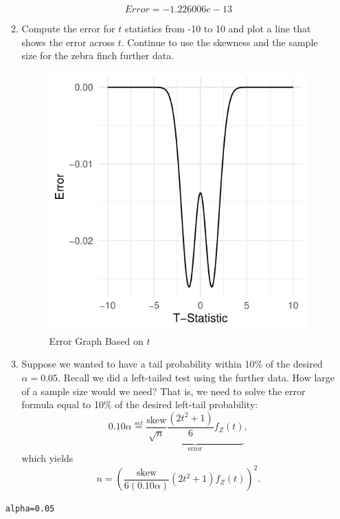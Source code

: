 \documentclass{article}\usepackage[]{graphicx}\usepackage[]{xcolor}
\makeatletter
\def\maxwidth{ %
  \ifdim\Gin@nat@width>\linewidth
    \linewidth
  \else
    \Gin@nat@width
  \fi
}
\newcommand{\hlnum}[1]{\textcolor[rgb]{0.686,0.059,0.569}{#1}}%
\newcommand{\hldef}[1]{\textcolor[rgb]{0.345,0.345,0.345}{#1}}%
\newcommand{\hlkwb}[1]{\textcolor[rgb]{0.69,0.353,0.396}{#1}}%
\newenvironment{kframe}{%
 \def\at@end@of@kframe{}%
 \ifinner\ifhmode%
  \def\at@end@of@kframe{\end{minipage}}%
  \begin{minipage}{\columnwidth}%
 \fi\fi%
 \def\FrameCommand##1{\hskip\@totalleftmargin \hskip-\fboxsep
 \colorbox{shadecolor}{##1}\hskip-\fboxsep
     \hskip-\linewidth \hskip-\@totalleftmargin \hskip\columnwidth}%
 \MakeFramed {\advance\hsize-\width
   \@totalleftmargin\z@ \linewidth\hsize
   \@setminipage}}%
 {\par\unskip\endMakeFramed%
 \at@end@of@kframe}
\newenvironment{knitrout}{}{} %
\makeatother
\begin{document}
\begin{enumerate}
\begin{enumerate}
\[ Error = -1.226006e-  13\]


  \item Compute the error for $t$ statistics from -10 to 10 and plot a line
  that shows the error across $t$. Continue to use the skewness and 
  the sample size for the zebra finch further data.
\begin{figure}[ht]
\begin{center}
\begin{knitrout}
\color{fgcolor}
\includegraphics[width=\maxwidth]{figure/errorgraph-1} 
\end{knitrout}
\caption{Error Graph Based on $t$}
\label{fig:errorgraph}
\end{center}
\end{figure}



  \item Suppose we wanted to have a tail probability within 10\% of the desired
  $\alpha=0.05$. Recall we did a left-tailed test using the further data.
  How large of a sample size would we need? That is, we need
  to solve the error formula equal to 10\% of the desired left-tail probability:
  \[0.10 \alpha  \stackrel{set}{=} \underbrace{\frac{\text{skew}}{\sqrt{n}} \frac{(2t^2+1)}{6} f_Z(t)}_{\textrm{error}},\]
  which yields
  \[ n = \left(\frac{\text{skew}}{6(0.10\alpha)} (2t^2 + 1) f_Z(t)\right)^2.\]
\end{enumerate}
\begin{knitrout}\scriptsize
{}\color{fgcolor}\begin{kframe}
\begin{alltt}
\hldef{alpha} \hlkwb{=} \hlnum{0.05}


\end{alltt}
\end{kframe}
\end{knitrout}
\end{enumerate}
\end{document}
